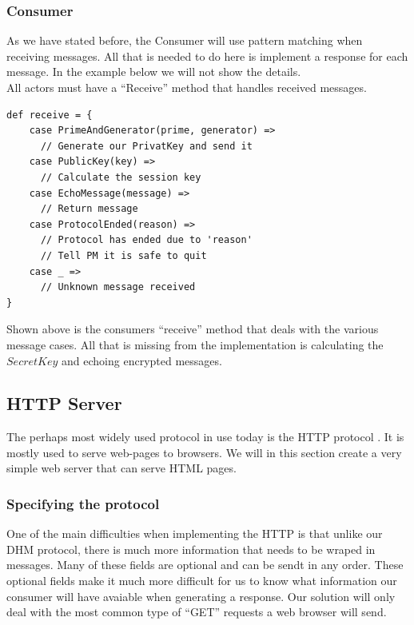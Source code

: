\subsubsection{Consumer}
As we have stated before, the Consumer will use pattern matching when receiving messages. All that is needed to do here is implement a response for each message. In the example below we will not show the details. 
\\
All actors must have a ``Receive'' method that handles received messages. 
\begin{lstlisting}[style=myScalastyle]
def receive = {
    case PrimeAndGenerator(prime, generator) =>
      // Generate our PrivatKey and send it
    case PublicKey(key) =>
      // Calculate the session key
    case EchoMessage(message) =>
      // Return message
    case ProtocolEnded(reason) =>
      // Protocol has ended due to 'reason'
      // Tell PM it is safe to quit
    case _ =>
      // Unknown message received
}
\end{lstlisting}
Shown above is the consumers ``receive'' method that deals with the various message cases. All that is missing from the implementation is calculating the $SecretKey$ and echoing encrypted messages.

\subsection{HTTP Server}
\label{sec:httpserver}
The perhaps most widely used protocol in use today is the HTTP protocol \cite{fielding1999hypertext}. It is mostly used to serve web-pages to browsers. We will in this section create a very simple web server that can serve HTML pages.

\subsubsection{Specifying the protocol}
One of the main difficulties when implementing the HTTP is that unlike our DHM protocol, there is much more information that needs to be wraped in messages. Many of these fields are optional and can be sendt in any order. These optional fields make it much more difficult for us to know what information our consumer will have avaiable when generating a response. Our solution will only deal with the most common type of ``GET'' requests a web browser will send.

